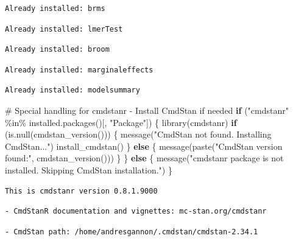 \documentclass[
  12,
  letterpaper,
  DIV=11,
  numbers=noendperiod]{scrartcl}
\newenvironment{Shaded}{\begin{snugshade}}{\end{snugshade}}
\newcommand{\CommentTok}[1]{\textcolor[rgb]{0.37,0.37,0.37}{#1}}
\newcommand{\ControlFlowTok}[1]{\textcolor[rgb]{0.00,0.23,0.31}{\textbf{#1}}}
\newcommand{\FunctionTok}[1]{\textcolor[rgb]{0.28,0.35,0.67}{#1}}
\newcommand{\NormalTok}[1]{\textcolor[rgb]{0.00,0.23,0.31}{#1}}
\newcommand{\SpecialCharTok}[1]{\textcolor[rgb]{0.37,0.37,0.37}{#1}}
\newcommand{\StringTok}[1]{\textcolor[rgb]{0.13,0.47,0.30}{#1}}
\begin{document}
\begin{verbatim}
Already installed: brms
\end{verbatim}

\begin{verbatim}
Already installed: lmerTest
\end{verbatim}

\begin{verbatim}
Already installed: broom
\end{verbatim}

\begin{verbatim}
Already installed: marginaleffects
\end{verbatim}

\begin{verbatim}
Already installed: modelsummary
\end{verbatim}

\begin{Shaded}
\begin{Highlighting}[numbers=left,,]
\CommentTok{\# Special handling for cmdstanr {-} Install CmdStan if needed}
\ControlFlowTok{if}\NormalTok{ (}\StringTok{"cmdstanr"} \SpecialCharTok{\%in\%} \FunctionTok{installed.packages}\NormalTok{()[, }\StringTok{"Package"}\NormalTok{]) \{}
  \FunctionTok{library}\NormalTok{(cmdstanr)}
  \ControlFlowTok{if}\NormalTok{ (}\FunctionTok{is.null}\NormalTok{(}\FunctionTok{cmdstan\_version}\NormalTok{())) \{}
    \FunctionTok{message}\NormalTok{(}\StringTok{"CmdStan not found. Installing CmdStan..."}\NormalTok{)}
    \FunctionTok{install\_cmdstan}\NormalTok{()}
\NormalTok{  \} }\ControlFlowTok{else}\NormalTok{ \{}
    \FunctionTok{message}\NormalTok{(}\FunctionTok{paste}\NormalTok{(}\StringTok{"CmdStan version found:"}\NormalTok{, }\FunctionTok{cmdstan\_version}\NormalTok{()))}
\NormalTok{  \}}
\NormalTok{\} }\ControlFlowTok{else}\NormalTok{ \{}
  \FunctionTok{message}\NormalTok{(}\StringTok{"cmdstanr package is not installed. Skipping CmdStan installation."}\NormalTok{)}
\NormalTok{\}}
\end{Highlighting}
\end{Shaded}

\begin{verbatim}
This is cmdstanr version 0.8.1.9000
\end{verbatim}

\begin{verbatim}
- CmdStanR documentation and vignettes: mc-stan.org/cmdstanr
\end{verbatim}

\begin{verbatim}
- CmdStan path: /home/andresgannon/.cmdstan/cmdstan-2.34.1
\end{verbatim}
\end{document}
